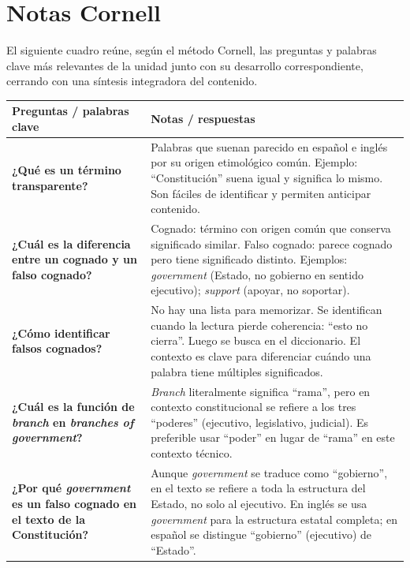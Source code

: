 \documentclass[12pt,oneside]{book}
\begin{document}
\chapter{Notas Cornell}

El siguiente cuadro reúne, según el método Cornell, las preguntas y palabras clave más relevantes de la unidad junto con su desarrollo correspondiente, cerrando con una síntesis integradora del contenido.

\begin{table}[H]
\centering
\begin{tabularx}{\textwidth}{
    >{\raggedright\arraybackslash}p{}
    >{\raggedright\arraybackslash}X
}
\toprule
\textbf{Preguntas / palabras clave} &
\textbf{Notas / respuestas} \\
\midrule

\textbf{¿Qué es un término transparente?} &
Palabras que suenan parecido en español e inglés por su origen etimológico común. Ejemplo: ``Constitución'' suena igual y significa lo mismo. Son fáciles de identificar y permiten anticipar contenido. \\

\textbf{¿Cuál es la diferencia entre un cognado y un falso cognado?} &
Cognado: término con origen común que conserva significado similar. Falso cognado: parece cognado pero tiene significado distinto. Ejemplos: \textit{government} (Estado, no gobierno en sentido ejecutivo); \textit{support} (apoyar, no soportar). \\

\textbf{¿Cómo identificar falsos cognados?} &
No hay una lista para memorizar. Se identifican cuando la lectura pierde coherencia: ``esto no cierra''. Luego se busca en el diccionario. El contexto es clave para diferenciar cuándo una palabra tiene múltiples significados. \\

\textbf{¿Cuál es la función de \textit{branch} en \textit{branches of government}?} &
\textit{Branch} literalmente significa ``rama'', pero en contexto constitucional se refiere a los tres ``poderes'' (ejecutivo, legislativo, judicial). Es preferible usar ``poder'' en lugar de ``rama'' en este contexto técnico. \\

\textbf{¿Por qué \textit{government} es un falso cognado en el texto de la Constitución?} &
Aunque \textit{government} se traduce como ``gobierno'', en el texto se refiere a toda la estructura del Estado, no solo al ejecutivo. En inglés se usa \textit{government} para la estructura estatal completa; en español se distingue ``gobierno'' (ejecutivo) de ``Estado''. \\


\end{tabularx}
\end{table}
\end{document}
